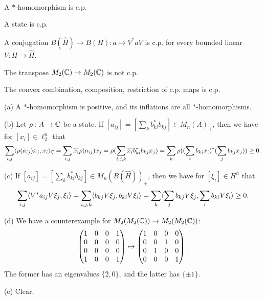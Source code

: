 \documentclass{../../../small}
\begin{document}
\begin{ex}\,
\begin{parts}
\item A $*$-homomorphism is c.p.
\item A state is c.p.
\item A conjugation $B(\hat H)\to B(H):a\mapsto V^*aV$ is c.p. for every bounded linear $V:H\to\hat H$.
\item The transpose $M_2(\mathbb{C})\to M_2(\mathbb{C})$ is not c.p.
\item The convex combination, composition, restriction of c.p. maps is c.p.
\end{parts}
\end{ex}
\begin{pf}
(a)
A $*$-homomorphism is positive, and its inflations are all $*$-homomorphisms.

(b)
Let $\rho:A\to\mathbb{C}$ be a state.
If $[a_{ij}]=[\sum_kb_{ki}^*b_{kj}]\in M_n(A)_+$, then we have for $[x_i]\in\ell_2^n$ that
\[\sum_{i,j}\langle\rho(a_{ij})x_j,x_i\rangle_{\mathbb{C}}=\sum_{i,j}\overline{x_i}\rho(a_{ij})x_j=\rho(\sum_{i,j,k}\overline{x_i}b_{ki}^*b_{kj}x_j)=\sum_k\rho((\sum_ib_{ki}x_i)^*(\sum_jb_{kj}x_j))\ge0.\]

(c)
If $[a_{ij}]=[\sum_kb_{ki}^*b_{kj}]\in M_n(B(\hat H))_+$, then we have for $[\xi_i]\in H^n$ that
\[\sum_{i,j}\langle V^*a_{ij}V\xi_j,\xi_i\rangle=\sum_{i,j,k}\langle b_{kj}V\xi_j,b_{ki}V\xi_i\rangle=\sum_k\langle\sum_jb_{kj}V\xi_j,\sum_ib_{ki}V\xi_i\rangle\ge0.\]

(d)
We have a counterexample for $M_2(M_2(\mathbb{C}))\to M_2(M_2(\mathbb{C}))$:
\[\begin{pmatrix}1&0&0&1\\0&0&0&0\\0&0&0&0\\1&0&0&1\end{pmatrix}\mapsto\begin{pmatrix}1&0&0&0\\0&0&1&0\\0&1&0&0\\0&0&0&1\end{pmatrix}.\]
The former has an eigenvalues $\{2,0\}$, and the latter has $\{\pm1\}$.

(e) Clear.
\end{pf}
\end{document}
